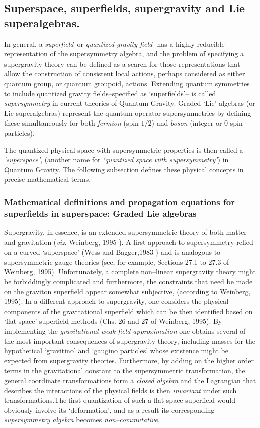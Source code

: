 \documentclass[12pt]{article}
\theoremstyle{plain}
\theoremstyle{definition}
\numberwithin{equation}{section}
\newcommand{\<}{{\langle}}
\begin{document}
\subsection{Superspace, superfields, supergravity and Lie superalgebras.} 
\bigbreak

In general, a \emph{superfield}--or \emph{quantized gravity field}- has a highly reducible representation of the supersymmetry algebra, and the problem of specifying a supergravity theory can be defined as a search for those 
representations that allow the construction of consistent local actions, perhaps considered 
as either quantum group, or quantum groupoid, actions. Extending quantum symmetries to include
quantized gravity fields--specified as `superfields'-- is called \emph{supersymmetry} in current theories of Quantum Gravity. Graded `Lie' algebras (or Lie superalgebras) represent the quantum operator supersymmetries
by defining these simultaneously for both \emph{fermion} (spin $1/2$) and \emph{boson} (integer or 0 spin particles).

The quantized physical space with supersymmetric properties is then called a \emph{`superspace'},
(another name for \emph{`quantized space with supersymmetry'}) in Quantum Gravity. The following subsection defines
these physical concepts in precise mathematical terms.


\subsubsection{Mathematical definitions and propagation equations for superfields in superspace:
Graded Lie algebras}

Supergravity, in essence, is an extended supersymmetric theory of
both matter and gravitation ({\em viz}. Weinberg, 1995 \cite{Weinberg2000}). 
A first approach to supersymmetry relied on a curved `superspace' 
(Wess and Bagger,1983 \cite{WB83}) and is analogous to supersymmetric gauge theories (see, for
example, Sections 27.1 to 27.3 of Weinberg, 1995). Unfortunately,
a complete non--linear supergravity theory might be forbiddingly
complicated and furthermore, the constraints that need be made on
the graviton superfield appear somewhat subjective, 
(according to Weinberg, 1995). In a different approach to supergravity, 
one considers the physical components of the gravitational superfield
which can be then identified based on `flat-space' superfield methods 
(Chs. 26 and 27 of Weinberg, 1995). By implementing the {\em gravitational
weak-field approximation} one obtains several of the most important
consequences of supergravity theory, including masses for the
hypothetical `gravitino' and `gaugino particles' whose existence might be
expected from supergravity theories. Furthermore, by adding on the
higher order terms in the gravitational constant to the
supersymmetric transformation, the general coordinate
transformations form a \emph{closed algebra} and the Lagrangian that
describes the interactions of the physical fields is then {\em invariant}
under such transformations.The first quantization of such a flat-space
superfield would obviously involve its `deformation', and as a result its corresponding
\emph{supersymmetry algebra} becomes \emph{non--commutative}.
\end{document}
